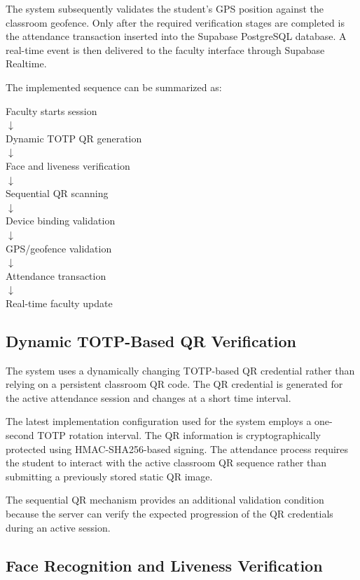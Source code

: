 \documentclass[conference]{IEEEtran}
\begin{document}
The system subsequently validates the student's GPS position against the classroom geofence. Only after the required verification stages are completed is the attendance transaction inserted into the Supabase PostgreSQL database. A real-time event is then delivered to the faculty interface through Supabase Realtime.

The implemented sequence can be summarized as:

\begin{center}
Faculty starts session\\
$\downarrow$\\
Dynamic TOTP QR generation\\
$\downarrow$\\
Face and liveness verification\\
$\downarrow$\\
Sequential QR scanning\\
$\downarrow$\\
Device binding validation\\
$\downarrow$\\
GPS/geofence validation\\
$\downarrow$\\
Attendance transaction\\
$\downarrow$\\
Real-time faculty update
\end{center}


\subsection{Dynamic TOTP-Based QR Verification}

The system uses a dynamically changing TOTP-based QR credential rather than relying on a persistent classroom QR code. The QR credential is generated for the active attendance session and changes at a short time interval.

The latest implementation configuration used for the system employs a one-second TOTP rotation interval. The QR information is cryptographically protected using HMAC-SHA256-based signing. The attendance process requires the student to interact with the active classroom QR sequence rather than submitting a previously stored static QR image.

The sequential QR mechanism provides an additional validation condition because the server can verify the expected progression of the QR credentials during an active session.


\subsection{Face Recognition and Liveness Verification}
\end{document}
